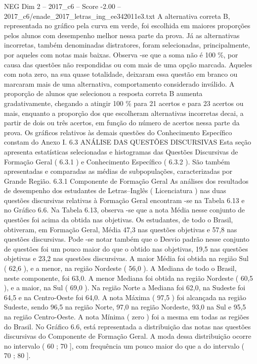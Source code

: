 \begin{textsample}{NEG Dim 2 – 2017\_c6 – Score -2.00 – 2017\_c6/enade\_2017\_letras\_ing\_ee342011e3.txt}
A alternativa correta B, representada no gráfico pela curva em verde, foi escolhida em maiores proporções pelos alunos com desempenho melhor nessa parte da prova.
Já as alternativas incorretas, também denominadas distratores, foram selecionadas, principalmente, por aqueles com notas mais baixas.
Observa -se que a soma não é 100 \%, por causa das questões não respondidas ou com mais de uma opção marcada.
Aqueles com nota zero, na sua quase totalidade, deixaram essa questão em branco ou marcaram mais de uma alternativa, comportamento considerado inválido.
A proporção de alunos que selecionou a resposta correta B aumenta gradativamente, chegando a atingir 100 \% para 21 acertos e para 23 acertos ou mais, enquanto a proporção dos que escolheram alternativas incorretas decai, a partir de dois ou três acertos, em função do número de acertos nessa parte da prova.
Os gráficos relativos às demais questões do Conhecimento Específico constam do Anexo I. 6.3 ANÁLISE DAS QUESTÕES DISCURSIVAS Esta seção apresenta estatísticas selecionadas e histogramas das Questões Discursivas de Formação Geral ( 6.3.1 ) e Conhecimento Específico ( 6.3.2 ).
São também apresentadas e comparadas as médias de subpopulações, caracterizadas por Grande Região. 6.3.1 Componente de Formação Geral As análises dos resultados de desempenho dos estudantes de Letras–Inglês ( Licenciatura ) nas duas questões discursivas relativas à Formação Geral encontram -se na Tabela 6.13 e no Gráfico 6.6.
Na Tabela 6.13, observa -se que a nota Média nesse conjunto de questões foi acima da obtida nas objetivas.
Os estudantes, de todo o Brasil, obtiveram, em Formação Geral, Média 47,3 nas questões objetivas e 57,8 nas questões discursivas.
Pode -se notar também que o Desvio padrão nesse conjunto de questões foi um pouco maior do que o obtido nas objetivas, 19,5 nas questões objetivas e 23,2 nas questões discursivas.
A maior Média foi obtida na região Sul ( 62,6 ), e a menor, na região Nordeste ( 56,0 ).
A Mediana de todo o Brasil, neste componente, foi 63,0.
A menor Mediana foi obtida na região Nordeste ( 60,5 ), e a maior, na Sul ( 69,0 ).
Na região Norte a Mediana foi 62,0, na Sudeste foi 64,5 e na Centro-Oeste foi 64,0.
A nota Máxima ( 97,5 ) foi alcançada na região Sudeste, sendo 96,5 na região Norte, 97,0 na região Nordeste, 93,0 na Sul e 95,5 na região Centro-Oeste.
A nota Mínima ( zero ) foi a mesma em todas as regiões do Brasil.
No Gráfico 6.6, está representada a distribuição das notas nas questões discursivas do Componente de Formação Geral.
A moda dessa distribuição ocorre no intervalo ( 60 ; 70 ], com frequência um pouco maior do que a do intervalo ( 70 ; 80 ].

\end{textsample}

